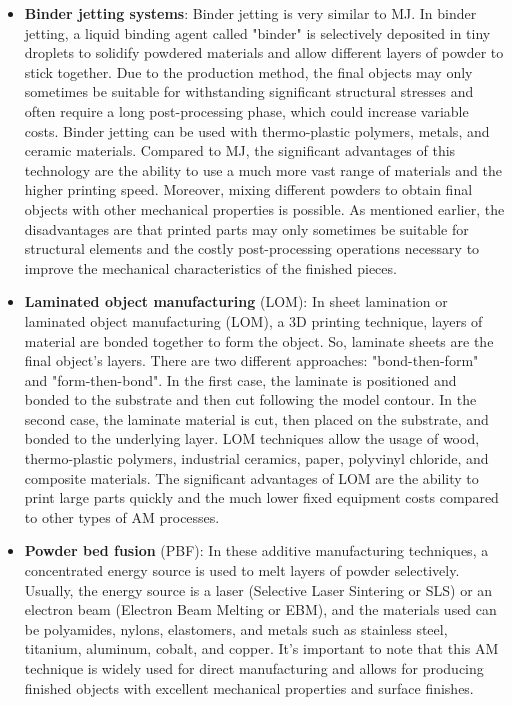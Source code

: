 \begin{itemize}
    \item \textbf{Binder jetting systems}: Binder jetting is very similar to MJ. In binder jetting, a liquid binding agent called "binder" is selectively deposited in tiny droplets to solidify powdered materials and allow different layers of powder to stick together. Due to the production method, the final objects may only sometimes be suitable for withstanding significant structural stresses and often require a long post-processing phase, which could increase variable costs. Binder jetting can be used with thermo-plastic polymers, metals, and ceramic materials. Compared to MJ, the significant advantages of this technology are the ability to use a much more vast range of materials and the higher printing speed. Moreover, mixing different powders to obtain final objects with other mechanical properties is possible. As mentioned earlier, the disadvantages are that printed parts may only sometimes be suitable for structural elements and the costly post-processing operations necessary to improve the mechanical characteristics of the finished pieces.
    \item \textbf{Laminated object manufacturing} (LOM): In sheet lamination or laminated object manufacturing (LOM), a 3D printing technique, layers of material are bonded together to form the object. So, laminate sheets are the final object's layers. There are two different approaches: "bond-then-form" and "form-then-bond". In the first case, the laminate is positioned and bonded to the substrate and then cut following the model contour. In the second case, the laminate material is cut, then placed on the substrate, and bonded to the underlying layer. LOM techniques allow the usage of wood, thermo-plastic polymers, industrial ceramics, paper, polyvinyl chloride, and composite materials. The significant advantages of LOM are the ability to print large parts quickly and the much lower fixed equipment costs compared to other types of AM processes.
    \item \textbf{Powder bed fusion} (PBF):  In these additive manufacturing techniques, a concentrated energy source is used to melt layers of powder selectively. Usually, the energy source is a laser (Selective Laser Sintering or SLS) or an electron beam (Electron Beam Melting or EBM), and the materials used can be polyamides, nylons, elastomers, and metals such as stainless steel, titanium, aluminum, cobalt, and copper. It's important to note that this AM technique is widely used for direct manufacturing and allows for producing finished objects with excellent mechanical properties and surface finishes.

\end{itemize}
